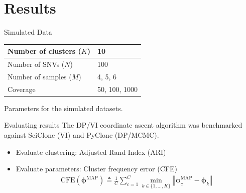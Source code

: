 \documentclass{beamer}
\newcommand{\bphi}{\ensuremath{\bm{\phi}}}
\begin{document}
\section{Results}
\begin{frame}{Simulated Data}
\begin{table}[ht]
\centering
\begin{tabular}{| l | l |}
\hline
Number of clusters ($K$) & 10            \\ \hline
Number of SNVs ($N$)     & 100           \\ \hline
Number of samples ($M$)  & 4, 5, 6       \\ \hline
Coverage                 & 50, 100, 1000  \\ \hline
\end{tabular}
\end{table}
\centerline{Parameters for the simulated datasets.}
\end{frame}

\begin{frame}{Evaluating results}
The DP/VI coordinate ascent algorithm was benchmarked against SciClone (VI) and PyClone (DP/MCMC). \vspace{0.15in}
\begin{itemize}
	\item Evaluate clustering: Adjusted Rand Index (ARI)
	\item Evaluate parameters: Cluster frequency error (CFE)
		\begin{align*}
		\text{CFE}(\bphi^{\text{MAP}}) \triangleq  \frac{1}{C} \sum_{c=1}^C \min_{k \in \{1, \ldots, K\}}  \left\Vert \bphi_c^{\text{MAP}} - \bphi_k \right\Vert
		\end{align*}
\end{itemize}
\end{frame}
\end{document}
